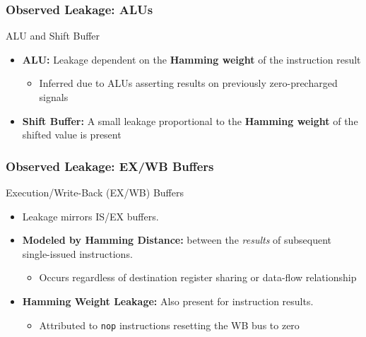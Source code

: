 \begin{frame}
    \frametitle{Observed Leakage: ALUs }
    \begin{block}{ALU and Shift Buffer}
        \begin{itemize}
            \item \textbf{ALU:} Leakage dependent on the \textbf{Hamming weight} of the instruction result
                \begin{itemize}
                    \item Inferred due to ALUs asserting results on previously zero-precharged signals
                \end{itemize}
            \item \textbf{Shift Buffer:} A small leakage proportional to the \textbf{Hamming weight} of the shifted value is present
        \end{itemize}
    \end{block}
\end{frame}

\begin{frame}
    \frametitle{Observed Leakage: EX/WB Buffers}
    \begin{block}{Execution/Write-Back (EX/WB) Buffers}
        \begin{itemize}
            \item Leakage mirrors IS/EX buffers.
            \item \textbf{Modeled by Hamming Distance:} between the \textit{results} of subsequent single-issued instructions.
                \begin{itemize}
                    \item Occurs regardless of destination register sharing or data-flow relationship
                \end{itemize}
            \item \textbf{Hamming Weight Leakage:} Also present for instruction results.
                \begin{itemize}
                    \item Attributed to \texttt{nop} instructions resetting the WB bus to zero 
                \end{itemize}
        \end{itemize}
    \end{block}
\end{frame}

